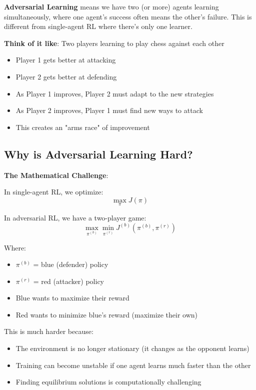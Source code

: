 \documentclass[11pt]{article}
\begin{document}
\begin{foundation}
\textbf{Adversarial Learning} means we have two (or more) agents learning simultaneously, where one agent's success often means the other's failure. This is different from single-agent RL where there's only one learner.
\end{foundation}

\begin{intuition}
\textbf{Think of it like}: Two players learning to play chess against each other
\begin{itemize}
\item Player 1 gets better at attacking
\item Player 2 gets better at defending  
\item As Player 1 improves, Player 2 must adapt to the new strategies
\item As Player 2 improves, Player 1 must find new ways to attack
\item This creates an "arms race" of improvement
\end{itemize}
\end{intuition}

\subsection{Why is Adversarial Learning Hard?}

\begin{mathdetails}
\textbf{The Mathematical Challenge}:

In single-agent RL, we optimize:
$$\max_{\pi} J(\pi)$$

In adversarial RL, we have a two-player game:
$$\max_{\pi^{(b)}} \min_{\pi^{(r)}} J^{(b)}(\pi^{(b)}, \pi^{(r)})$$

Where:
\begin{itemize}
\item $\pi^{(b)}$ = blue (defender) policy
\item $\pi^{(r)}$ = red (attacker) policy  
\item Blue wants to maximize their reward
\item Red wants to minimize blue's reward (maximize their own)
\end{itemize}

This is much harder because:
\begin{itemize}
\item The environment is no longer stationary (it changes as the opponent learns)
\item Training can become unstable if one agent learns much faster than the other
\item Finding equilibrium solutions is computationally challenging
\end{itemize}
\end{mathdetails}
\end{document}
